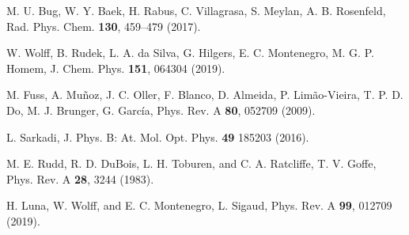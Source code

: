 \documentclass[10pt,showpacs,showkeys,twocolumn]{revtex4-1}
\begin{document}
\begin{thebibliography}{}
M. U. Bug, W. Y. Baek, H. Rabus, C. Villagrasa, S. Meylan, 
A. B. Rosenfeld,
Rad. Phys. Chem. \textbf{130}, 459--479 (2017).


W. Wolff, B. Rudek, L. A. da Silva, G. Hilgers, E. C. Montenegro, 
M. G. P. Homem,
J. Chem. Phys. \textbf{151}, 064304 (2019).

M. Fuss, A. Muñoz, J. C. Oller, F. Blanco, D. Almeida, P. Limão-Vieira, 
T. P. D. Do, M. J. Brunger, G. Garc\'{i}a,
Phys. Rev. A \textbf{80}, 052709 (2009).

 L. Sarkadi, J. Phys. B: At. Mol. Opt. Phys. \textbf{49} 185203 (2016).


M. E. Rudd, R. D. DuBois, L. H. Toburen, and C. A. Ratcliffe, 
T. V. Goffe, 
Phys. Rev. A \textbf{28}, 3244 (1983).

H. Luna, W. Wolff, and E. C. Montenegro, L. Sigaud, 
Phys. Rev. A \textbf{99}, 012709 (2019).


\end{thebibliography}
\end{document}
